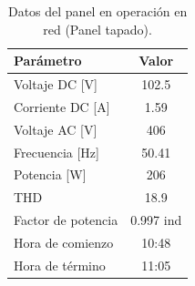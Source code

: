 \begin{table}[H]
\centering
\caption{Datos del panel en operación en red (Panel tapado).}
\begin{tabular}{|l|c|}
\hline
\textbf{Parámetro} & \textbf{Valor} \\ \hline
Voltaje DC [V]     & 102.5   \\ \hline
Corriente DC [A]   & 1.59    \\ \hline
Voltaje AC [V]     & 406     \\ \hline
Frecuencia [Hz]    & 50.41   \\ \hline
Potencia [W]       & 206     \\ \hline
THD                & 18.9    \\ \hline
Factor de potencia & 0.997 ind \\ \hline
Hora de comienzo   & 10:48   \\ \hline
Hora de término    & 11:05   \\ \hline
\end{tabular}
\label{tabla:AC tapado}
\end{table}